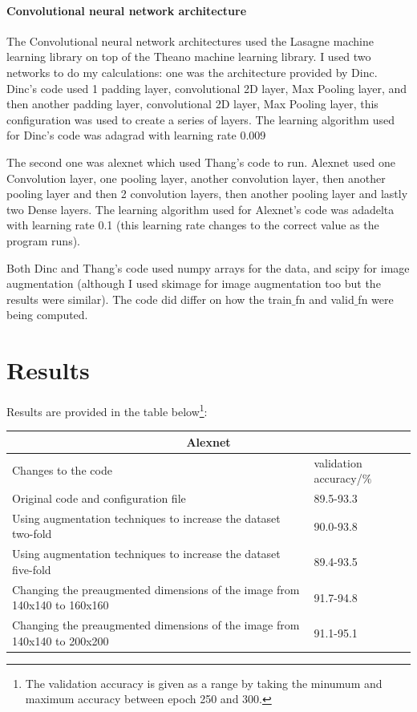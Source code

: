 \documentclass[11pt,twocolumn]{article}
\begin{document}
\paragraph{Convolutional neural network architecture}

The Convolutional neural network architectures used the Lasagne machine learning library on top of the Theano machine learning library. I used two networks to do my calculations: one was the architecture provided by Dinc. Dinc's code used 1 padding layer, convolutional 2D layer, Max Pooling layer, and then another  padding layer, convolutional 2D layer, Max Pooling layer, this configuration was used to create a series of layers. The learning algorithm used for Dinc's code was adagrad with learning rate 0.009

The second one was alexnet which used Thang's code to run. Alexnet used one Convolution layer, one pooling layer, another convolution layer, then another pooling layer and then 2 convolution layers, then another pooling layer and lastly two Dense layers. The learning algorithm used for Alexnet's code was adadelta with learning rate 0.1 (this learning rate changes to the correct value as the program runs).

Both Dinc and Thang's code used numpy arrays for the data, and scipy for image augmentation (although I used skimage for image augmentation too but the results were similar). The code did differ on how the train$\_$fn and valid$\_$fn were being computed. 

\section{Results}
\label{sec:results}

Results are provided in the table below\footnote{The validation accuracy is given as a range by taking the minumum and maximum accuracy between epoch 250 and 300.}:

\begin{tabular}{ |p{5cm}||p{2.5cm}|  }
 \hline
 \multicolumn{2}{|c|}{Alexnet} \\
 \hline
 Changes to the code & validation accuracy/$\%$\\
 \hline
 Original code and configuration file&89.5-93.3\\
 \hline
 Using augmentation techniques to increase the dataset two-fold&90.0-93.8 \\
 \hline
 Using augmentation techniques to increase the dataset five-fold&89.4-93.5 \\
 \hline
 Changing the preaugmented dimensions of the image from 140x140 to 160x160&91.7-94.8 \\
 \hline
 Changing the preaugmented dimensions of the image from 140x140 to 200x200&91.1-95.1 \\
 \hline
\end{tabular}
\end{document}
